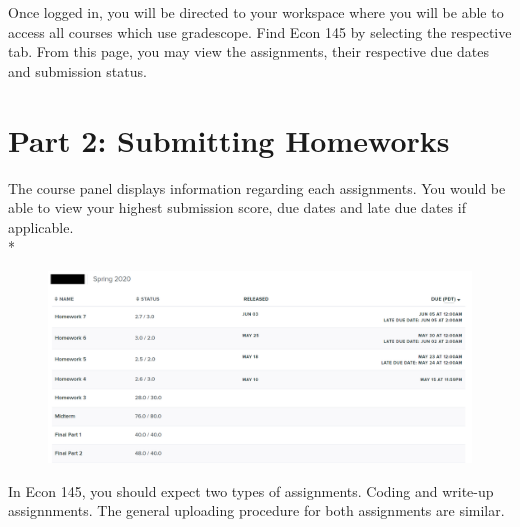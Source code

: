 \documentclass{article}
\begin{document}
Once logged in, you will be directed to your workspace where you will be able to access all courses which use gradescope.
Find Econ 145 by selecting the respective tab. From this page, you may view the assignments, their respective due dates and submission status. 
\section{Part 2: Submitting Homeworks}
\hspace{\parindent}The course panel displays information regarding each assignments. You would be able to view your highest submission score, due dates and late due dates if applicable. \\*
\begin{figure}[h]
\centerline{\includegraphics[scale=.5]{Assignment.png}}
\label{fig}
\end{figure}

In Econ 145, you should expect two types of assignments. Coding and write-up assignnments. The general uploading procedure for both assignments are similar. 
\end{document}
